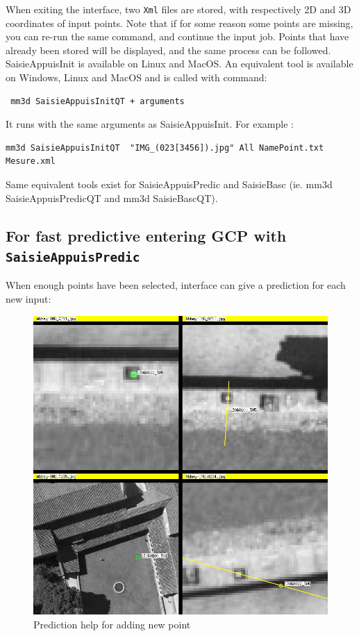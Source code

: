 When exiting the interface, two {\tt Xml} files are stored, with respectively 2D and 3D coordinates of input points.
Note that if for some reason some points are missing, you can re-run the same command, and continue the input job.
Points that have already been stored will be displayed, and the same process can be followed.\\

SaisieAppuisInit is available on Linux and MacOS.
An equivalent tool is available on Windows, Linux and MacOS and is called with command: \begin{verbatim} mm3d SaisieAppuisInitQT + arguments \end{verbatim}
It runs with the same arguments as SaisieAppuisInit. For example :
\begin{verbatim}
mm3d SaisieAppuisInitQT  "IMG_(023[3456]).jpg" All NamePoint.txt  Mesure.xml
\end{verbatim}

Same equivalent tools exist for SaisieAppuisPredic and SaisieBasc (ie. mm3d SaisieAppuisPredicQT and mm3d SaisieBascQT).


\subsection{For fast predictive entering GCP with {\tt SaisieAppuisPredic}}

When enough points have been selected, interface can give a prediction for each new input:

\begin{figure}[H]
\begin{center}
\includegraphics[width=120mm]{FIGS/Saisie/prediction.jpg}
\end{center}
\caption{Prediction help for adding new point}
\label{FIG:SaisieAppuis:prediction}
\end{figure}

